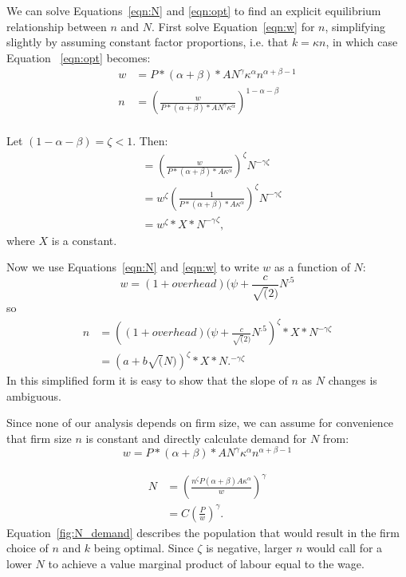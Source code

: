 \documentclass[]{article}
\begin{document}
We can solve Equations~\ref{eqn:N} and \ref{eqn:opt} to find an explicit equilibrium relationship between $n$ and $N$. First solve Equation~\ref{eqn:w} for $n$, simplifying slightly by assuming constant factor proportions, i.e. that  $k=\kappa n$, in which case Equation~ \ref{eqn:opt} becomes: 
\begin{align}\label{eqn:opt1}
w   &= P*(\alpha+\beta)*AN^\gamma \kappa^\alpha n^{\alpha+\beta-1} \\   
n  &=\left(\frac{w}{P*(\alpha+\beta)*AN^\gamma \kappa^\alpha}\right)^{1-\alpha-\beta} \\
\end{align}

Let $(1-\alpha-\beta) = \zeta <1.$ Then:
\begin{align}
    &=\left(\frac{w}{P*(\alpha+\beta)*A \kappa^\alpha}\right)^\zeta N^{-\gamma\zeta }\\
    &=w^\zeta\left(\frac{1}{P*(\alpha+\beta)*A \kappa^\alpha}\right)^\zeta N^{-\gamma\zeta }\\
    &=w^\zeta*X*{N^{-\gamma}}^\zeta,
\end{align}
where $X$ is a constant.

Now we use Equations~\ref{eqn:N} and \ref{eqn:w} to write $w$ as a function of $N$:
\[w=(1+overhead)(\psi+\frac{c}{\sqrt(2)}N^{.5}\]
so
\begin{align}
    n &= \left((1+overhead)(\psi+\frac{c}{\sqrt(2)}N^{.5}\right)^\zeta*X*N^{-\gamma\zeta }\\
  &= \left(a+b\sqrt(N)\right)^\zeta*X*N.^{-\gamma\zeta }   
\end{align}
In this simplified form it is easy to show that the slope of $n$ as $N$ changes is ambiguous. %

Since none of our analysis depends on firm size, we can assume for convenience that firm size $n$ is constant and directly calculate demand for $N$ from:
\[w  = P*(\alpha+\beta)*AN^\gamma \kappa^\alpha n^{\alpha+\beta-1}  \]

\begin{align}\label{fig:N_demand}
N   &= (\frac{n^\zeta P(\alpha+\beta)A\kappa^\alpha}{w})^\gamma  \nonumber\\
    &= C \left(\frac{P}{w}\right)^\gamma.
\end{align}
Equation~\ref{fig:N_demand} describes the population that would result in the firm choice of $n$ and $k$ being optimal. Since $\zeta$ is negative, larger  $n$ would call for a lower $N$ to achieve a value marginal product of labour equal to the wage.


\end{document}
